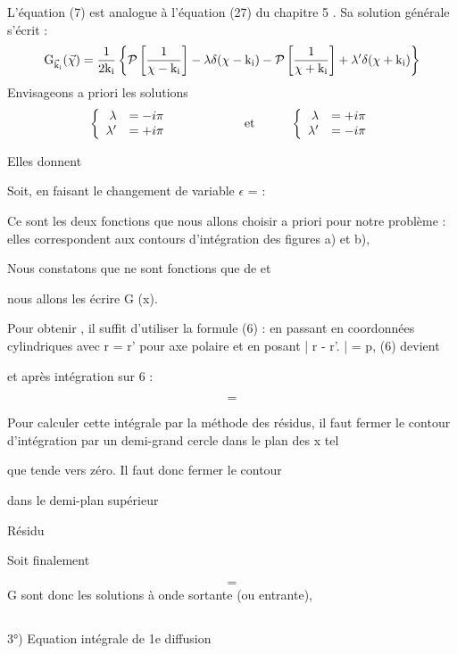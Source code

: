 L'équation (7) est analogue à l'équation (27) du chapitre 5
. Sa solution générale s'écrit :
\[
\text{G}_{\vec{\text{k}}_{\text{i}}}(\vec{\chi})=\frac{1}{2\text{k}_{\text{i}}}\left\{\mathcal{P}\left[\frac{1}{\chi-\text{k}_{\text{i}}}\right]-\lambda\delta(\chi-\text{k}_{\text{i}})
-\mathcal{P}\left[\frac{1}{\chi+\text{k}_{\text{i}}}\right]+\lambda'\delta(\chi+\text{k}_{\text{i}})\right\}
\]
Envisageons a priori les solutions
\[
\left\{
\begin{array}{rl}
\lambda & =-i\pi \\
\lambda' & =+i\pi
\end{array}
\right.
\hspace{2cm}\text{et}\hspace{1cm}
\left\{
\begin{array}{rl}
\lambda & =+i\pi \\
\lambda' & =-i\pi
\end{array}
\right.
\]

Elles donnent

Soit, en faisant le changement de variable $\epsilon$ =  :

Ce sont les deux fonctions  que nous allons choisir a priori pour
notre problème : elles correspondent aux contours d'intégration des figures a) et b),

Nous constatons que  ne sont fonctions que de  et

nous allons les écrire G (x).

Pour obtenir , il suffit d'utiliser la formule (6) : en passant en coordonnées
cylindriques avec r = r' pour axe polaire et en posant | r - r'. | = p, (6) devient


et après intégration sur 6 :

\[
\tag{27}=
\]

Pour calculer cette intégrale par la méthode des résidus, il faut fermer
le contour d'intégration par un demi-grand cercle dans le plan des x tel

que  tende vers zéro. Il faut donc fermer le contour

dans le demi-plan supérieur

 Résidu

Soit finalement

\[
\tag{9}=
\]
G sont donc les solutions à onde sortante (ou entrante),


\subsection{}%
3°) Equation intégrale de 1e diffusion

